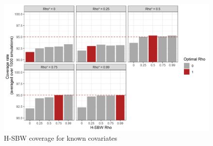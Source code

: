 \begin{figure}[H]
\begin{center}
    \caption{H-SBW coverage for known covariates}\label{fig:hsbwcoveragex}
    \includegraphics[scale=0.5]{01_Plots/coverage-x-plot.png}
\end{center}
\end{figure}